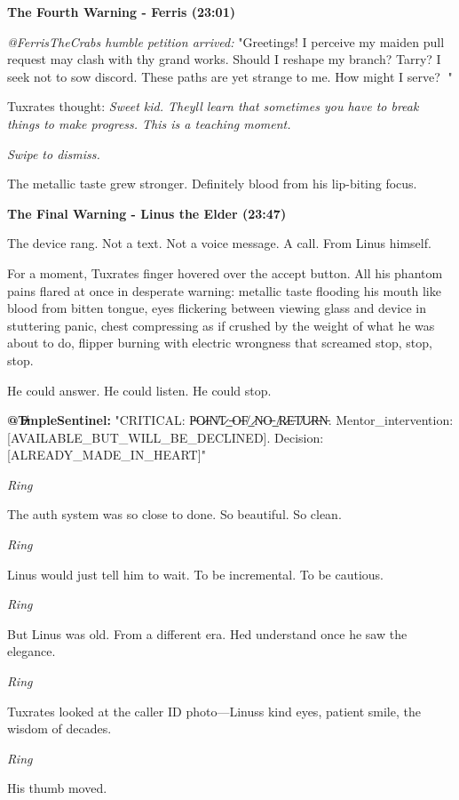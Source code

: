 \textbf{The Fourth Warning - Ferris (23:01)}

\emph{@FerrisTheCrab\textquotesingle s humble petition arrived:} "Greetings! I perceive my maiden pull request may clash with thy grand works. Should I reshape my branch? Tarry? I seek not to sow discord. These paths are yet strange to me. How might I serve? 🦀"

Tuxrates\textquotesingle{} thought: \emph{Sweet kid. They\textquotesingle ll learn that sometimes you have to break things to make progress. This is a teaching moment.}

\emph{Swipe to dismiss.}

The metallic taste grew stronger. Definitely blood from his lip-biting focus.

\textbf{The Final Warning - Linus the Elder (23:47)}

The device rang. Not a text. Not a voice message. A call. From Linus himself.

For a moment, Tuxrates\textquotesingle{} finger hovered over the accept button. All his phantom pains flared at once in desperate warning: metallic taste flooding his mouth like blood from bitten tongue, eyes flickering between viewing glass and device in stuttering panic, chest compressing as if crushed by the weight of what he was about to do, flipper burning with electric wrongness that screamed stop, stop, stop.

He could answer. He could listen. He could stop.

\textbf{@T̸̵̷̶mpleSentinel:} "CRITICAL: P̶O̷I̵N̸T̷\_̶O̵F̸\_̷N̵O̶\_̸R̷E̵T̸U̷R̶N̵. Mentor\_intervention: {[}AVAILABLE\_BUT\_WILL\_BE\_DECLINED{]}. Decision: {[}ALREADY\_MADE\_IN\_HEART{]}"

\emph{Ring}

The auth system was so close to done. So beautiful. So clean.

\emph{Ring}

Linus would just tell him to wait. To be incremental. To be cautious.

\emph{Ring}

But Linus was old. From a different era. He\textquotesingle d understand once he saw the elegance.

\emph{Ring}

Tuxrates looked at the caller ID photo---Linus\textquotesingle s kind eyes, patient smile, the wisdom of decades.

\emph{Ring}

His thumb moved.

